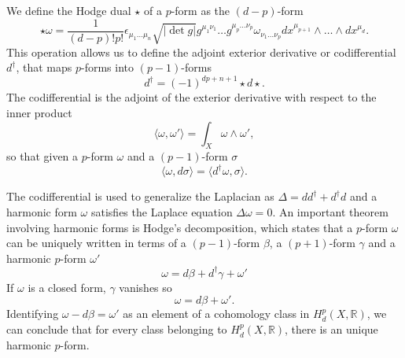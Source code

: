 We define the Hodge dual $\star$ of a $p$-form as the $(d-p)$-form
\begin{equation}
  \star \omega = \frac{1}{(d-p)!p!}\epsilon_{\mu_1\ldots\mu_n}\sqrt{|\det g|} g^{\mu_1 \nu_1}\ldots g^{\mu_p\ldots\nu_p}\omega_{\nu_1\ldots\nu_p}dx^{\mu_{p+1}}\wedge \ldots\wedge dx^{\mu_d}.
\end{equation}
This operation allows us to define the adjoint exterior derivative or codifferential $d^\dagger$, 
that maps $p$-forms into $(p-1)$-forms
\begin{equation}
  d^\dagger=(-1)^{dp+n+1}\star d \star. 
\end{equation}
The codifferential is the adjoint of the exterior derivative with respect to the inner product
\begin{equation}
  \langle \omega,\omega'\rangle = \int_X \omega\wedge\omega',
\end{equation}
so that given a $p$-form $\omega$ and a $(p-1)$-form $\sigma$
\begin{equation}
  \langle \omega, d\sigma \rangle = \langle d^\dagger \omega, \sigma\rangle.
\end{equation}

The codifferential is used to generalize the Laplacian as $\Delta = dd^\dagger+d^\dagger d$ and
a harmonic form $\omega$ satisfies the Laplace equation $\Delta \omega=0$.
An important theorem involving harmonic forms is Hodge's decomposition, which states 
that a  $p$-form $\omega$ can be uniquely written in terms of a $(p-1)$-form $\beta$, 
a $(p+1)$-form $\gamma$ and a harmonic $p$-form $\omega'$
\begin{equation}
  \omega = d\beta + d^\dagger \gamma +\omega'
\end{equation}
If $\omega$ is a closed form, $\gamma$ vanishes so
\begin{equation}
  \omega = d\beta + \omega'.
\end{equation}
Identifying $\omega - d\beta= \omega'$ as an element of a cohomology class in $H_d^p(X,\mathbb R)$,
we can conclude that for every class belonging to $H_d^p(X,\mathbb R)$, there is an unique
harmonic $p$-form.

